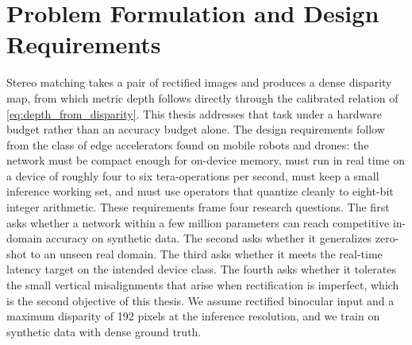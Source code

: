 \section{Problem Formulation and Design Requirements}
Stereo matching takes a pair of rectified images and produces a dense
disparity map, from which metric depth follows directly through the
calibrated relation of \eqref{eq:depth_from_disparity}. This thesis
addresses that task under a hardware budget rather than an accuracy
budget alone. The design requirements follow from the class of edge
accelerators found on mobile robots and drones: the network must be
compact enough for on-device memory, must run in real time on a device
of roughly four to six tera-operations per second, must keep a small
inference working set, and must use operators that quantize cleanly to
eight-bit integer arithmetic. These requirements frame four research
questions. The first asks whether a network within a few million
parameters can reach competitive in-domain accuracy on synthetic data.
The second asks whether it generalizes zero-shot to an unseen real
domain. The third asks whether it meets the real-time latency target on
the intended device class. The fourth asks whether it tolerates the
small vertical misalignments that arise when rectification is imperfect,
which is the second objective of this thesis. We assume rectified
binocular input and a maximum disparity of 192 pixels at the inference
resolution, and we train on synthetic data with dense ground truth.

